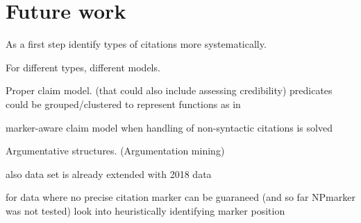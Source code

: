 \chapter{Future work}\label{chap:todo}
As a first step identify types of citations more systematically.

For different types, different models.

Proper claim model. (that could also include assessing credibility\cite{Popat2016})
predicates could be grouped/clustered to represent functions as in \cite{Gabor2018}

marker-aware claim model when handling of non-syntactic citations is solved

Argumentative structures. (Argumentation mining\cite{Stab2016,Lippi2016,Habernal2017})

also data set is already extended with 2018 data\cite{Saier2019}

for data where no precise citation marker can be guaraneed (and so far NPmarker was not tested) look into heuristically identifying marker position
